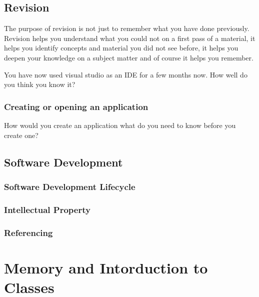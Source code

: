 \documentclass[
]{book}
\begin{document}
\hypertarget{revision}{%
\section{Revision}\label{revision}}

The purpose of revision is not just to remember what you have done previously. Revision helps you understand what you could not on a first pass of a material, it helps you identify concepts and material you did not see before, it helps you deepen your knowledge on a subject matter and of course it helps you remember.

You have now used visual studio as an IDE for a few months now. How well do you think you know it?

\hypertarget{creating-or-opening-an-application}{%
\subsection{Creating or opening an application}\label{creating-or-opening-an-application}}

How would you create an application what do you need to know before you create one?

\hypertarget{software-development}{%
\section{Software Development}\label{software-development}}

\hypertarget{software-development-lifecycle}{%
\subsection{Software Development Lifecycle}\label{software-development-lifecycle}}

\hypertarget{intellectual-property}{%
\subsection{Intellectual Property}\label{intellectual-property}}

\hypertarget{referencing}{%
\subsection{Referencing}\label{referencing}}

\hypertarget{memory-and-intorduction-to-classes}{%
\chapter{Memory and Intorduction to Classes}\label{memory-and-intorduction-to-classes}}
\end{document}

